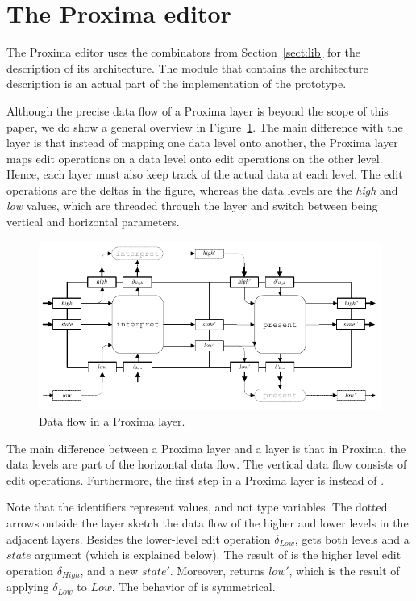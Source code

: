 \documentclass[preprint,natbib]{sigplanconf}
\begin{document}
							
%																
\section{The Proxima editor} \label{sect:proxima}


The Proxima editor uses the combinators from Section~\ref{sect:lib} for the description of its architecture. The module that contains the architecture description is an actual part of the implementation of the prototype. 

Although the precise data flow of a Proxima layer is beyond the scope of this paper, we do show a general overview in Figure~\ref{proximaDataFlow}. The main difference with the  layer is that instead of mapping one data level onto another, the Proxima layer maps edit operations on a data level onto edit operations on the other level. Hence, each layer must also keep track of the actual data at each level. The edit operations are the deltas in the figure, whereas the data levels are the {\em high} and {\em low} values, which are threaded through the layer and switch between being vertical and horizontal parameters. 


\begin{figure}
\includegraphics[width=\columnwidth]{images/LayerDataFlow}
\caption{Data flow in a Proxima layer.} \label{proximaDataFlow}
\end{figure}



\bc
The main difference between a Proxima layer and a  layer is that in Proxima, the data levels are part of the horizontal data flow. The vertical data flow consists of edit operations. Furthermore, the first step in a Proxima layer is  instead of .

Note that the identifiers represent values, and not type variables. The dotted arrows outside the layer sketch the data flow of the higher and lower levels in the adjacent layers. Besides the lower-level edit operation $\delta_{Low}$,  gets both levels and a $state$ argument (which is explained below). The result of  is the higher level edit operation $\delta_{High}$, and a new $state'$. Moreover,  returns $low'$, which is the result of applying $\delta_{Low}$ to $Low$. The behavior of  is symmetrical.
\end{document}
